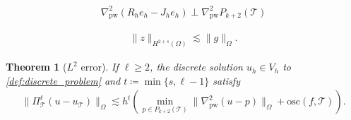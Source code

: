 \documentclass[10pt,a4paper]{amsart}
\newtheorem{theorem}{Theorem}
\def\T{\mathcal{T}}
\def\pw{\mathrm{pw}}
\begin{document}
    \begin{align}\label{eq:orth-R-J}
    	\nabla^2_\mathrm{pw} (R_h e_h - J_h e_h) \perp \nabla^2_\mathrm{pw} P_{k+2}(\mathcal{T})
    \end{align}

\begin{align}\label{ineq:elliptic-reg}
	\|z\|_{H^{2+s}(\Omega)} \lesssim \|g\|_\Omega.
\end{align}

\begin{theorem}[$L^2$ error]\label{thm:L2}
	If $\ell \geq 2$, the discrete solution $u_h \in V_h$ to \eqref{def:discrete_problem} and $t \coloneqq \min\{s,\ell-1\}$ satisfy
	\begin{align*}
		\|\Pi_\T^\ell(u - u_\T)\|_\Omega \lesssim h^{t} (\min_{p \in P_{k+2}(\mathcal{T})}\|\nabla^2_\pw(u - p)\|_{\Omega} + \mathrm{osc}(f,\T)).
	\end{align*}
\end{theorem}
\end{document}
